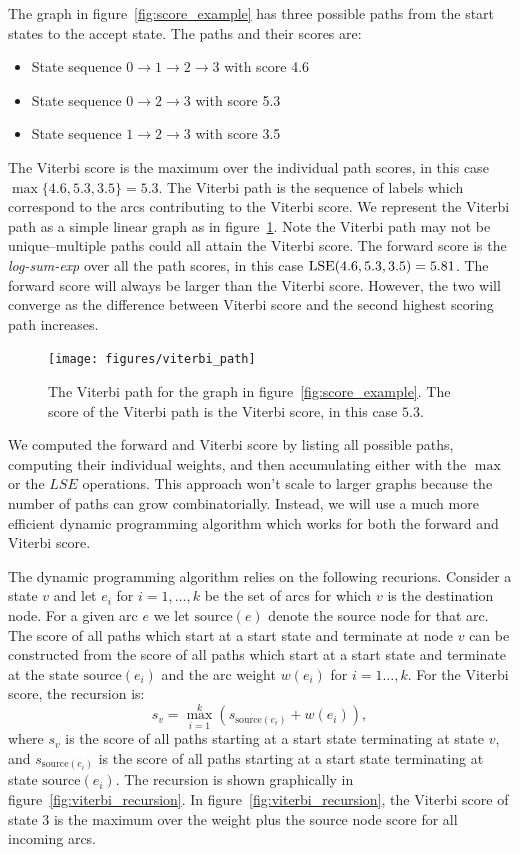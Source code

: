 The graph in figure~\ref{fig:score_example} has three possible paths from the
start states to the accept state. The paths and their scores are:

\begin{itemize}
    \item State sequence $0 \rightarrow 1 \rightarrow 2 \rightarrow 3$ with
        score 4.6
    \item State sequence $0 \rightarrow 2 \rightarrow 3$ with score 5.3
    \item State sequence $1 \rightarrow 2 \rightarrow 3$ with score 3.5
\end{itemize}

The Viterbi score is the maximum over the individual path scores, in this case
$\max\{4.6, 5.3, 3.5\} = 5.3$. The Viterbi path is the sequence of labels which
correspond to the arcs contributing to the Viterbi score. We represent the
Viterbi path as a simple linear graph as in figure~\ref{fig:viterbi_path}. Note
the Viterbi path may not be unique--multiple paths could all attain the Viterbi
score. The forward score is the \emph{log-sum-exp} over all the path scores, in
this case $\operatorname*{\textrm{LSE}}(4.6, 5.3, 3.5) = 5.81$. The forward score will always be larger
than the Viterbi score. However, the two will converge as the difference
between Viterbi score and the second highest scoring path increases.

\begin{figure}
    \centering
    \texttt{[image: figures/viterbi\_path]}
    \caption{The Viterbi path for the graph in figure~\ref{fig:score_example}.
    The score of the Viterbi path is the Viterbi score, in this case $5.3$.}
    \label{fig:viterbi_path}
\end{figure}

We computed the forward and Viterbi score by listing all possible paths,
computing their individual weights, and then accumulating either with the
$\max$ or the $LSE$ operations. This approach won't scale to larger graphs
because the number of paths can grow combinatorially. Instead, we will use a
much more efficient dynamic programming algorithm which works for both the
forward and Viterbi score.

The dynamic programming algorithm relies on the following recurions. Consider a
state $v$ and let $e_i$ for $i=1, \ldots, k$ be the set of arcs for which $v$
is the destination node. For a given arc $e$ we let $\textrm{source}(e)$ denote
the source node for that arc. The score of all paths which start at a start
state and terminate at node $v$ can be constructed from the score of all paths
which start at a start state and terminate at the state $\textrm{source}(e_i)$
and the arc weight $w(e_i)$ for $i=1\ldots, k$. For the Viterbi score, the
recursion is:
$$
s_v = \max_{i=1}^k \left( s_{\textrm{source}(e_i)} + w(e_i) \right),
$$
where $s_v$ is the score of all paths starting at a start state terminating at
state $v$, and $s_{\textrm{source}(e_i)}$ is the score of all paths starting at
a start state terminating at state $\textrm{source}(e_i)$. The recursion is
shown graphically in figure~\ref{fig:viterbi_recursion}. In
figure~\ref{fig:viterbi_recursion}, the Viterbi score of state $3$ is the
maximum over the weight plus the source node score for all incoming arcs.

